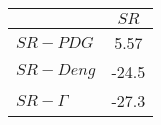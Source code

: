 \begin{tabular}{l|c}
\toprule
{} &  $SR$ \\
\midrule
\textbf{$SR-PDG$   } &  5.57 \\
\textbf{$SR-Deng$  } & -24.5 \\
\textbf{$SR-\Gamma$} & -27.3 \\
\bottomrule
\end{tabular}
